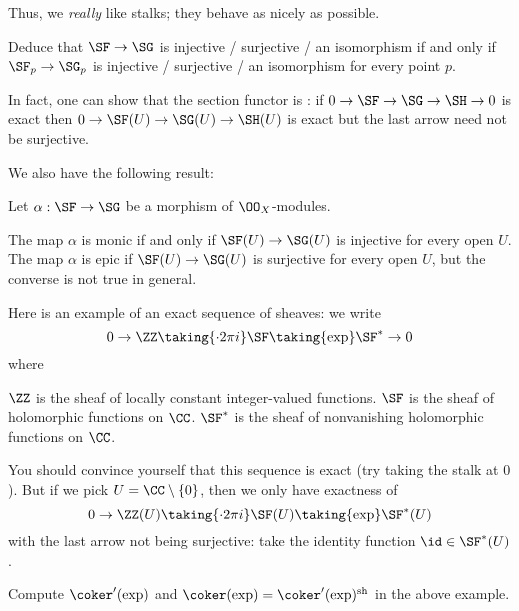 \documentclass[11pt]{scrreprt}
\begin{document}
Thus, we \emph{really} like stalks; they behave as nicely as possible.
\begin{ques}
	Deduce that $\SF \to \SG$ is injective / surjective / an isomorphism
	if and only if $\SF_p \to \SG_p$ is injective / surjective / an isomorphism
	for every point $p$.
\end{ques}

\begin{remark}
	In fact, one can show that the section functor is :
	if $0 \to \SF \to \SG \to \SH \to 0$ is exact then
	$0 \to \SF(U) \to \SG(U) \to \SH(U)$ is exact but the
	last arrow need not be surjective.
\end{remark}

We also have the following result:
\begin{theorem}
	Let $\alpha : \SF \to \SG$ be a morphism of $\OO_X$-modules.
	\begin{enumerate}[(a)]
		\ii The map $\alpha$ is monic if and only if $\SF(U) \to \SG(U)$
		is injective for every open $U$.
		\ii The map $\alpha$ is epic if $\SF(U) \to \SG(U)$
		is surjective for every open $U$,
		but the converse is not true in general.
	\end{enumerate}
\end{theorem}

\begin{example}
	Here is an example of an exact sequence of sheaves:
	we write
	\[ 0 \to \ZZ \taking{\cdot 2\pi i} \SF \taking{\exp} \SF^\ast \to 0 \]
	where
	\begin{itemize}
		\ii $\ZZ$ is the sheaf of locally constant integer-valued functions.
		\ii $\SF$ is the sheaf of holomorphic functions on $\CC$.
		\ii $\SF^\ast$ is the sheaf of nonvanishing
			holomorphic functions on $\CC$.
	\end{itemize}
	You should convince yourself that this sequence is exact
	(try taking the stalk at $0$).
	But if we pick $U = \CC \setminus \{0\}$, then we only have exactness of
	\[ 0 \to \ZZ(U) \taking{\cdot 2\pi i} \SF(U) \taking{\exp} \SF^\ast(U) \]
	with the last arrow not being surjective:
	take the identity function $\id \in \SF^\ast(U)$.
\end{example}
\begin{exercise}
	Compute $\coker'(\exp)$ and $\coker(\exp) = \coker'(\exp)\sh$
	in the above example.
\end{exercise}
\end{document}

